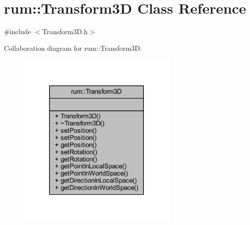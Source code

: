 \hypertarget{classrum_1_1_transform3_d}{}\section{rum\+:\+:Transform3D Class Reference}
\label{classrum_1_1_transform3_d}


{\ttfamily \#include $<$Transform3\+D.\+h$>$}



Collaboration diagram for rum\+:\+:Transform3D\+:\nopagebreak
\begin{figure}[H]
\begin{center}
\leavevmode
\includegraphics[width=224pt]{classrum_1_1_transform3_d__coll__graph}
\end{center}
\end{figure}
